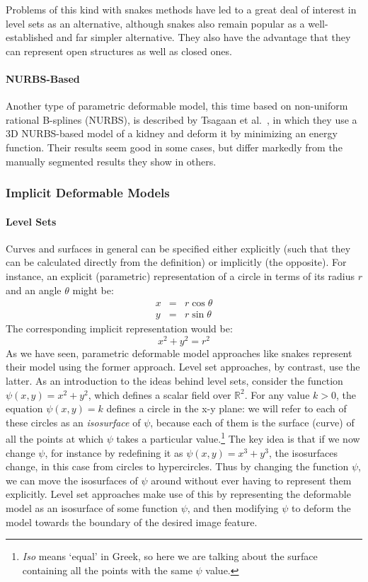 Problems of this kind with snakes methods have led to a great deal of interest in level sets as an alternative, although snakes also remain popular as a well-established and far simpler alternative. They also have the advantage that they can represent open structures as well as closed ones.

\paragraph{NURBS-Based}

Another type of parametric deformable model, this time based on non-uniform rational B-splines (NURBS), is described by Tsagaan et al.\ \cite{tsagaan02}, in which they use a 3D NURBS-based model of a kidney and deform it by minimizing an energy function. Their results seem good in some cases, but differ markedly from the manually segmented results they show in others.

\subsubsection{Implicit Deformable Models}

\paragraph{Level Sets}

Curves and surfaces in general can be specified either explicitly (such that they can be calculated directly from the definition) or implicitly (the opposite). For instance, an explicit (parametric) representation of a circle in terms of its radius $r$ and an angle $\theta$ might be:
%
\begin{eqnarray*}
x & = & r \cos \theta \\
y & = & r \sin \theta
\end{eqnarray*}
%
The corresponding implicit representation would be:
%
\[
x^2 + y^2 = r^2
\]
%
As we have seen, parametric deformable model approaches like snakes represent their model using the former approach. Level set approaches, by contrast, use the latter. As an introduction to the ideas behind level sets, consider the function $\psi(x,y) = x^2 + y^2$, which defines a scalar field over $\mathbb{R}^2$. For any value $k > 0$, the equation $\psi(x,y) = k$ defines a circle in the x-y plane: we will refer to each of these circles as an \emph{isosurface} of $\psi$, because each of them is the surface (curve) of all the points at which $\psi$ takes a particular value.\footnote{\emph{Iso} means `equal' in Greek, so here we are talking about the surface containing all the points with the same $\psi$ value.} The key idea is that if we now change $\psi$, for instance by redefining it as $\psi(x,y) = x^3 + y^3$, the isosurfaces change, in this case from circles to hypercircles. Thus by changing the function $\psi$, we can move the isosurfaces of $\psi$ around without ever having to represent them explicitly. Level set approaches make use of this by representing the deformable model as an isosurface of some function $\psi$, and then modifying $\psi$ to deform the model towards the boundary of the desired image feature.

